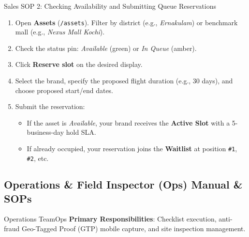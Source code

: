 \documentclass[11pt,a4paper]{article}
\begin{document}
\begin{sopbox}{Sales SOP 2: Checking Availability and Submitting Queue Reservations}
\begin{enumerate}[leftmargin=1.2em, itemsep=2pt]
    \item Open \textbf{Assets} (\texttt{/assets}). Filter by district (e.g., \textit{Ernakulam}) or benchmark mall (e.g., \textit{Nexus Mall Kochi}).
    \item Check the status pin: \textit{Available} (green) or \textit{In Queue} (amber).
    \item Click \textbf{Reserve slot} on the desired display.
    \item Select the brand, specify the proposed flight duration (e.g., 30 days), and choose proposed start/end dates.
    \item Submit the reservation:
    \begin{itemize}[leftmargin=1em, itemsep=2pt]
        \item If the asset is \textit{Available}, your brand receives the \textbf{Active Slot} with a 5-business-day hold SLA.
        \item If already occupied, your reservation joins the \textbf{Waitlist} at position \texttt{\#1}, \texttt{\#2}, etc.
    \end{itemize}
\end{enumerate}
\end{sopbox}

\newpage

\subsection{Operations \& Field Inspector (Ops) Manual \& SOPs}

\begin{rolebox}{Operations Team}{Ops}
\textbf{Primary Responsibilities}: Checklist execution, anti-fraud Geo-Tagged Proof (GTP) mobile capture, and site inspection management.
\end{rolebox}
\end{document}
